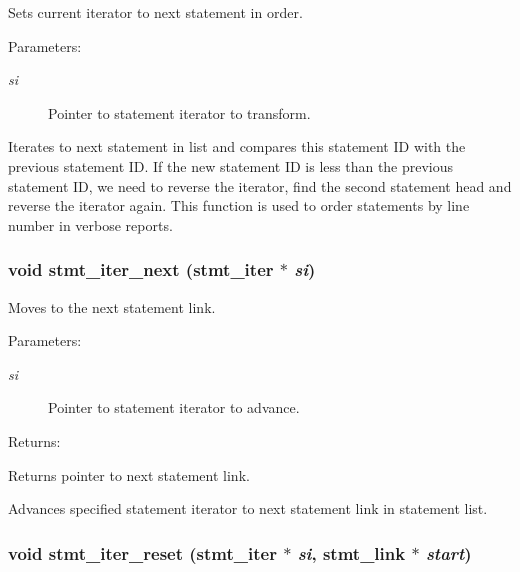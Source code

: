 Sets current iterator to next statement in order.

\begin{Desc}
\item[Parameters: ]\par
\begin{description}
\item[{\em 
si}]Pointer to statement iterator to transform.\end{description}
\end{Desc}
Iterates to next statement in list and compares this statement ID with the previous statement ID. If the new statement ID is less than the previous statement ID, we need to reverse the iterator, find the second statement head and reverse the iterator again. This function is used to order statements by line number in verbose reports. 
\subsubsection{\setlength{\rightskip}{0pt plus 5cm}void stmt\_\-iter\_\-next ({\bf stmt\_\-iter} $\ast$ {\em si})}\label{iter_8h_a1}


Moves to the next statement link.

\begin{Desc}
\item[Parameters: ]\par
\begin{description}
\item[{\em 
si}]Pointer to statement iterator to advance.\end{description}
\end{Desc}
\begin{Desc}
\item[Returns: ]\par
Returns pointer to next statement link.\end{Desc}
Advances specified statement iterator to next statement link in statement list. 
\subsubsection{\setlength{\rightskip}{0pt plus 5cm}void stmt\_\-iter\_\-reset ({\bf stmt\_\-iter} $\ast$ {\em si}, {\bf stmt\_\-link} $\ast$ {\em start})}\label{iter_8h_a0}


